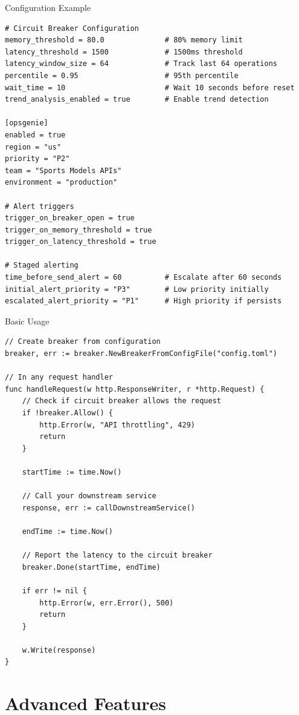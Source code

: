 \documentclass[aspectratio=169]{beamer}
\begin{document}
\begin{frame}[fragile]{Configuration Example}
\begin{lstlisting}[style=gostyle]
# Circuit Breaker Configuration
memory_threshold = 80.0              # 80% memory limit
latency_threshold = 1500             # 1500ms threshold
latency_window_size = 64             # Track last 64 operations
percentile = 0.95                    # 95th percentile
wait_time = 10                       # Wait 10 seconds before reset
trend_analysis_enabled = true        # Enable trend detection

[opsgenie]
enabled = true
region = "us"
priority = "P2"
team = "Sports Models APIs"
environment = "production"

# Alert triggers
trigger_on_breaker_open = true
trigger_on_memory_threshold = true
trigger_on_latency_threshold = true

# Staged alerting
time_before_send_alert = 60          # Escalate after 60 seconds
initial_alert_priority = "P3"        # Low priority initially
escalated_alert_priority = "P1"      # High priority if persists
\end{lstlisting}
\end{frame}

\begin{frame}[fragile]{Basic Usage}
\begin{lstlisting}[style=gostyle]
// Create breaker from configuration
breaker, err := breaker.NewBreakerFromConfigFile("config.toml")

// In any request handler
func handleRequest(w http.ResponseWriter, r *http.Request) {
    // Check if circuit breaker allows the request
    if !breaker.Allow() {
        http.Error(w, "API throttling", 429)
        return
    }
    
    startTime := time.Now()
    
    // Call your downstream service
    response, err := callDownstreamService()
    
    endTime := time.Now()
    
    // Report the latency to the circuit breaker
    breaker.Done(startTime, endTime)
    
    if err != nil {
        http.Error(w, err.Error(), 500)
        return
    }
    
    w.Write(response)
}
\end{lstlisting}
\end{frame}

\section{Advanced Features}
\end{document}

